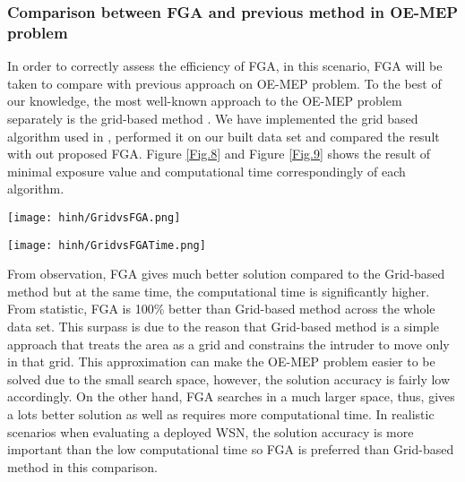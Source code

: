 \documentclass[final]{elsarticle}
\begin{document}
\subsubsection{Comparison between FGA and previous method in OE-MEP problem}
In order to correctly assess the efficiency of FGA, in this scenario, FGA will be taken to compare with previous approach on OE-MEP problem. To the best of our knowledge, the most well-known approach to the OE-MEP problem separately is the grid-based method \cite{liu2017obstacle}. We have implemented the grid based algorithm used in \cite{liu2017obstacle}, performed it on our built data set and compared the result with out proposed FGA. Figure \ref{Fig.8} and Figure \ref{Fig.9} shows the result of minimal exposure value and computational time correspondingly of each algorithm.
\begin{figure*}[h]
	\texttt{[image: hinh/GridvsFGA.png]}
	\centering
	\caption{The Minimal Exposure Value comparison between FGA and Grid based method on some noble topologies
	}
	\label{Fig.8}       %
\end{figure*}
\begin{figure*}[h]
	\texttt{[image: hinh/GridvsFGATime.png]}
	\centering
	\caption{The Computational Time (sec) comparison between FGA and Grid based method on some noble topologies
	}
	\label{Fig.9}       %
\end{figure*}

From observation, FGA gives much better solution compared to the Grid-based method but at the same time, the computational time is significantly higher. From statistic, FGA is 100\% better than Grid-based method across the whole data set. This surpass is due to the reason that Grid-based method is a simple approach that treats the area as a grid and constrains the intruder to move only in that grid. This approximation can make the OE-MEP problem easier to be solved due to the small search space, however, the solution accuracy is fairly low accordingly. On the other hand, FGA searches in a much larger space, thus, gives a lots better solution as well as requires more computational time. In realistic scenarios when evaluating a deployed WSN, the solution accuracy is more important than the low computational time so FGA is preferred than Grid-based method in this comparison. 
\end{document}
